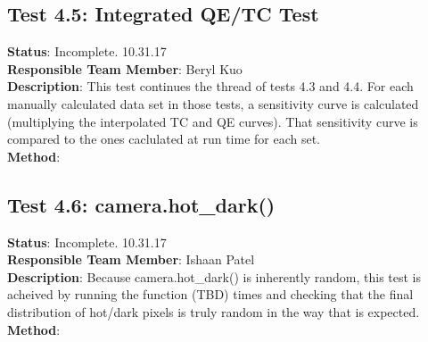 \documentclass[]{DINOReportMemo}
\begin{document}
\subsection{Test 4.5: Integrated QE/TC Test}
\textbf{Status}: Incomplete. 10.31.17\\
\textbf{Responsible Team Member}: Beryl Kuo \\
\textbf{Description}: This test continues the thread of tests 4.3 and 4.4. For each manually calculated data set in those tests, a sensitivity curve is calculated (multiplying the interpolated TC and QE curves). That sensitivity curve is compared to the ones caclulated at run time for each set.\\
\textbf{Method}: \\

\subsection{Test 4.6: camera.hot\_dark()}
\textbf{Status}: Incomplete. 10.31.17\\
\textbf{Responsible Team Member}: Ishaan Patel \\
\textbf{Description}: Because camera.hot\_dark() is inherently random, this test is acheived by running the function (TBD) times and checking that the final distribution of hot/dark pixels is truly random in the way that is expected. \\
\textbf{Method}: \\
\end{document}
